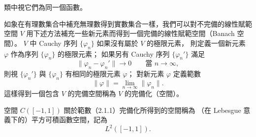 \documentclass[11pt,a4paper,twoside]{article}
\newif\ifstudynotes
\newcommand{\StudyNote}[2]{%
    \ifstudynotes
    \begin{studyNote}[title={#1}]
    #2
    \end{studyNote}
    \fi
}
\newcommand{\pnum}[1]{%
    \makebox[0pt][r]{%
        \scriptsize\textbf{[#1]}\hspace{0.7em}%
    }%
}
\begin{document}
\newpage

\noindent
\pnum{43}
類中視它們為同一個函數。
\StudyNote{複習註解：例 3 為什麼會導向 $L^2$ 與 $L^p$？}{
    例 3 已經證明：
    $C([-1,1])$ 配上 $L^2$ 範數時並不完備，
    因為連續函數的 Cauchy 序列可能在 $L^2$ 意義下收斂到不連續函數。

    因此把這些缺少的 $L^2$ 極限補進來後，得到
    \[
        \boxed{
            C([-1,1])
            \overset{\text{完備化}}{\longrightarrow}
            L^2([-1,1])
        }.
    \]

    一般化後，對 $p\ge1$，
    \[
        \|u\|_{L^p(\Omega)}
        =
        \left(
        \int_{\Omega}|u(x)|^p\,dx
        \right)^{1/p},
    \]
    相應的完備空間就是 $L^p(\Omega)$。

    所以例 3 的主線是：
    \[
        \boxed{
            \text{Cauchy 序列的極限跑出原空間}
            \;\Longrightarrow\;
            \text{原空間不完備}
            \;\Longrightarrow\;
            \text{做完備化}
        }.
    \]
}
\noindent
\pnum{44}
如象在有理數集合中補充無理數得到實數集合一樣，我們可以對不完備的線性賦範空間
$V$ 用下述方法補充一些新元素而得到一個完備的線性賦範空間（Banach 空間）。
$V$ 中 Cauchy 序列 $\{\varphi_n\}$ 如果沒有屬於 $V$ 的極限元素，
則定義一個新元素 $\varphi$ 作為序列 $\{\varphi_n\}$ 的極限元素；
如果另有 Cauchy 序列 $\{\varphi_n'\}$ 滿足
\[
    \|\varphi_n-\varphi_n'\|\longrightarrow 0
    \qquad
    \text{當 }n\to\infty,
\]
則視 $\{\varphi_n'\}$ 與 $\{\varphi_n\}$ 有相同的極限元素 $\varphi$；
對新元素 $\varphi$ 定義範數
\[
    \|\varphi\|
    =
    \lim_{n\to\infty}\|\varphi_n\|.
\]
這樣得到一個包含 $V$ 的完備空間稱為 $V$ 的完備化（空間）。

\noindent
\pnum{45}
空間 $C([-1,1])$ 關於範數（2.1.1）完備化所得到的空間稱為
（在 Lebesgue 意義下的）平方可積函數空間，記為
\[
    L^2([-1,1]).
\]
\end{document}
